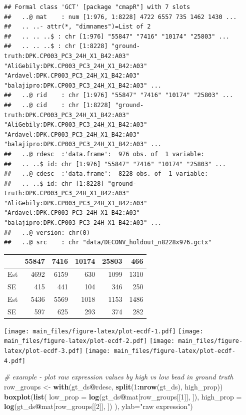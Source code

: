 \documentclass[]{article}
\newenvironment{Shaded}{\begin{snugshade}}{\end{snugshade}}
\newcommand{\CommentTok}[1]{\textcolor[rgb]{0.56,0.35,0.01}{\textit{#1}}}
\newcommand{\DataTypeTok}[1]{\textcolor[rgb]{0.13,0.29,0.53}{#1}}
\newcommand{\DecValTok}[1]{\textcolor[rgb]{0.00,0.00,0.81}{#1}}
\newcommand{\KeywordTok}[1]{\textcolor[rgb]{0.13,0.29,0.53}{\textbf{#1}}}
\newcommand{\NormalTok}[1]{#1}
\newcommand{\OperatorTok}[1]{\textcolor[rgb]{0.81,0.36,0.00}{\textbf{#1}}}
\newcommand{\StringTok}[1]{\textcolor[rgb]{0.31,0.60,0.02}{#1}}
\begin{document}
\begin{verbatim}
## Formal class 'GCT' [package "cmapR"] with 7 slots
##   ..@ mat    : num [1:976, 1:8228] 4722 6557 735 1462 1430 ...
##   .. ..- attr(*, "dimnames")=List of 2
##   .. .. ..$ : chr [1:976] "55847" "7416" "10174" "25803" ...
##   .. .. ..$ : chr [1:8228] "ground-truth:DPK.CP003_PC3_24H_X1_B42:A03" "AliGebily:DPK.CP003_PC3_24H_X1_B42:A03" "Ardavel:DPK.CP003_PC3_24H_X1_B42:A03" "balajipro:DPK.CP003_PC3_24H_X1_B42:A03" ...
##   ..@ rid    : chr [1:976] "55847" "7416" "10174" "25803" ...
##   ..@ cid    : chr [1:8228] "ground-truth:DPK.CP003_PC3_24H_X1_B42:A03" "AliGebily:DPK.CP003_PC3_24H_X1_B42:A03" "Ardavel:DPK.CP003_PC3_24H_X1_B42:A03" "balajipro:DPK.CP003_PC3_24H_X1_B42:A03" ...
##   ..@ rdesc  :'data.frame':  976 obs. of  1 variable:
##   .. ..$ id: chr [1:976] "55847" "7416" "10174" "25803" ...
##   ..@ cdesc  :'data.frame':  8228 obs. of  1 variable:
##   .. ..$ id: chr [1:8228] "ground-truth:DPK.CP003_PC3_24H_X1_B42:A03" "AliGebily:DPK.CP003_PC3_24H_X1_B42:A03" "Ardavel:DPK.CP003_PC3_24H_X1_B42:A03" "balajipro:DPK.CP003_PC3_24H_X1_B42:A03" ...
##   ..@ version: chr(0) 
##   ..@ src    : chr "data/DECONV_holdout_n8228x976.gctx"
\end{verbatim}

\begin{longtable}[]{@{}lrrrrr@{}}
\toprule
& 55847 & 7416 & 10174 & 25803 & 466\tabularnewline
\midrule
\endhead
Est & 4692 & 6159 & 630 & 1099 & 1310\tabularnewline
SE & 415 & 441 & 104 & 346 & 250\tabularnewline
Est & 5436 & 5569 & 1018 & 1153 & 1486\tabularnewline
SE & 597 & 625 & 293 & 374 & 282\tabularnewline
\bottomrule
\end{longtable}

\texttt{[image: main\_files/figure-latex/plot-ecdf-1.pdf]}
\texttt{[image: main\_files/figure-latex/plot-ecdf-2.pdf]}
\texttt{[image: main\_files/figure-latex/plot-ecdf-3.pdf]}
\texttt{[image: main\_files/figure-latex/plot-ecdf-4.pdf]}

\begin{Shaded}
\begin{Highlighting}[]
\CommentTok{# example - plot raw expression values by high vs low bead in ground truth}
\NormalTok{row_groups <-}\StringTok{ }\KeywordTok{with}\NormalTok{(gt_ds}\OperatorTok{@}\NormalTok{rdesc, }\KeywordTok{split}\NormalTok{(}\DecValTok{1}\OperatorTok{:}\KeywordTok{nrow}\NormalTok{(gt_ds), high_prop))}
\KeywordTok{boxplot}\NormalTok{(}\KeywordTok{list}\NormalTok{(}
  \DataTypeTok{low_prop =} \KeywordTok{log}\NormalTok{(gt_ds}\OperatorTok{@}\NormalTok{mat[row_groups[[}\DecValTok{1}\NormalTok{]], ]),}
  \DataTypeTok{high_prop =} \KeywordTok{log}\NormalTok{(gt_ds}\OperatorTok{@}\NormalTok{mat[row_groups[[}\DecValTok{2}\NormalTok{]], ])}
\NormalTok{), }\DataTypeTok{ylab=}\StringTok{"raw expression"}\NormalTok{)}
\end{Highlighting}
\end{Shaded}
\end{document}
